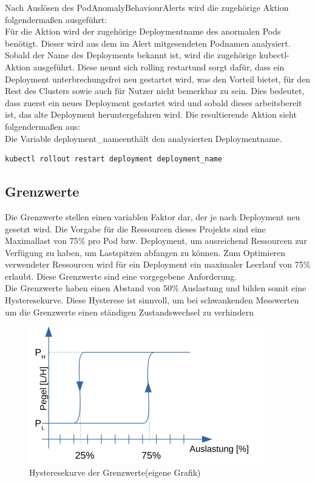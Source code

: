 \documentclass[a4paper,10pt]{scrartcl}
\begin{document}
Nach Auslösen des \glqq PodAnomalyBehaviour\grqq Alerts wird die zugehörige Aktion folgendermaßen ausgeführt:\\

Für die Aktion wird der zugehörige Deploymentname des anormalen Pods benötigt. Dieser wird aus dem im Alert mitgesendeten Podnamen analysiert. Sobald der Name des Deployments bekannt ist, wird die zugehörige kubectl-Aktion ausgeführt. Diese nennt sich \glqq rolling restart\grqq und sorgt dafür, dass ein Deployment unterbrechungsfrei neu gestartet wird, was den Vorteil bietet, für den Rest des Clusters sowie auch für Nutzer nicht bemerkbar zu sein. Dies bedeutet, dass zuerst ein neues Deployment gestartet wird und sobald dieses arbeitsbereit ist, das alte Deployment heruntergefahren wird. Die resultierende Aktion sieht folgendermaßen aus:\\
Die Variable \glqq deployment\_name\grqq enthält den analysierten Deploymentname.
\begin{lstlisting}
kubectl rollout restart deployment deployment_name
\end{lstlisting}

\subsection{Grenzwerte}

Die Grenzwerte stellen einen variablen Faktor dar, der je nach Deployment neu gesetzt wird. Die Vorgabe für die Ressourcen dieses Projekts sind eine Maximallast von 75\% pro Pod bzw. Deployment, um ausreichend Ressourcen zur Verfügung zu haben, um Lastspitzen abfangen zu können. Zum Optimieren verwendeter Ressourcen wird für ein Deployment ein maximaler Leerlauf von 75\% erlaubt. Diese Grenzwerte sind eine vorgegebene Anforderung.\\
Die Grenzwerte haben einen Abstand von 50\% Auslastung und bilden somit eine Hysteresekurve. Diese Hysterese ist sinnvoll, um bei schwankenden Messwerten um die Grenzwerte einen ständigen Zustandswechsel zu verhindern

\begin{figure}[htbp]
  \includegraphics{Hysterese.png}
  \caption{Hysteresekurve der Grenzwerte(eigene Grafik)}
\end{figure}
\end{document}
